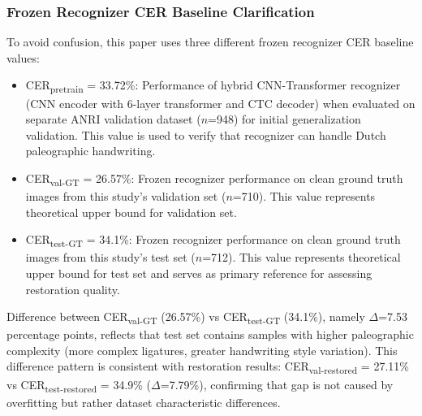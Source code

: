 \documentclass[journal]{IEEEtran}
\begin{document}
\subsubsection{Frozen Recognizer CER Baseline Clarification} 
To avoid confusion, this paper uses three different frozen recognizer CER baseline values:\vspace{-0.5em}
\begin{itemize}[itemsep=0pt]
    \item CER\textsubscript{pretrain} = 33.72\%: Performance of hybrid CNN-Transformer recognizer (CNN encoder with 6-layer transformer and CTC decoder) when evaluated on separate ANRI validation dataset ($n$=948) for initial generalization validation. This value is used to verify that recognizer can handle Dutch paleographic handwriting.
    \item CER\textsubscript{val-GT} = 26.57\%: Frozen recognizer performance on clean ground truth images from this study's validation set ($n$=710). This value represents theoretical upper bound for validation set.
    \item CER\textsubscript{test-GT} = 34.1\%: Frozen recognizer performance on clean ground truth images from this study's test set ($n$=712). This value represents theoretical upper bound for test set and serves as primary reference for assessing restoration quality.
\end{itemize}
\vspace{0.5em}
Difference between CER\textsubscript{val-GT} (26.57\%) vs CER\textsubscript{test-GT} (34.1\%), namely $\Delta$=7.53 percentage points, reflects that test set contains samples with higher paleographic complexity (more complex ligatures, greater handwriting style variation). This difference pattern is consistent with restoration results: CER\textsubscript{val-restored} = 27.11\% vs CER\textsubscript{test-restored} = 34.9\% ($\Delta$=7.79\%), confirming that gap is not caused by overfitting but rather dataset characteristic differences.
\end{document}
